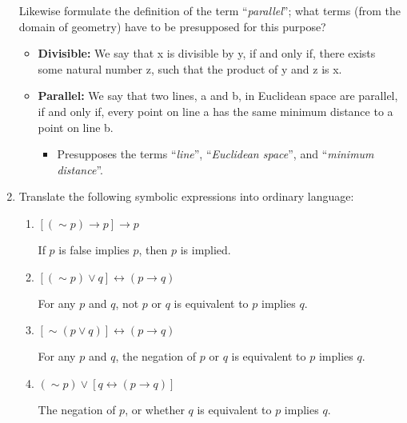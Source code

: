 \begin{enumerate}
  Likewise formulate the definition of the term ``\emph{parallel}'';
  what terms (from the domain of geometry) have to be presupposed for
  this purpose?
  \begin{itemize}
  \item \textbf{Divisible:} We say that x is divisible by y, if and
    only if, there exists some natural number z, such that the product
    of y and z is x.
  \item \textbf{Parallel:} We say that two lines, a and b, in
    Euclidean space are parallel, if and only if, every point on line
    a has the same minimum distance to a point on line b.
    \begin{itemize}
      \item Presupposes the terms ``\emph{line}'', ``\emph{Euclidean space}'', and
        ``\emph{minimum distance}''.
    \end{itemize}
  \end{itemize}
\item Translate the following symbolic expressions into ordinary language:
  \begin{enumerate}
  \item $[(\sim p) \rightarrow p ] \rightarrow p$

    If $p$ is false implies $p$, then $p$ is implied.
  \item $[(\sim p) \vee q ] \leftrightarrow (p \rightarrow q)$

    For any $p$ and $q$, not $p$ or $q$ is equivalent to $p$ implies $q$.
  \item $[\sim (p \vee q)] \leftrightarrow (p \rightarrow q)$

    For any $p$ and $q$, the negation of $p$ or $q$ is equivalent to $p$ implies $q$.
  \item $(\sim p) \vee [ q \leftrightarrow (p \rightarrow q)]$

    The negation of $p$, or whether $q$ is equivalent to $p$ implies $q$.
  \end{enumerate}
\end{enumerate}
